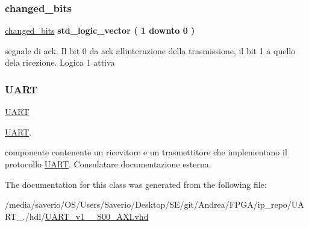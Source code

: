 \subsubsection{\texorpdfstring{changed\+\_\+bits}{changed\_bits}}
{\footnotesize\ttfamily \hyperlink{classUART__v1__0__S00__AXI_1_1arch__imp_a8b1599924c5da95abaa3e673fc0d2cb7}{changed\+\_\+bits} {\bfseries \textcolor{vhdlchar}{std\+\_\+logic\+\_\+vector}\textcolor{vhdlchar}{ }\textcolor{vhdlchar}{(}\textcolor{vhdlchar}{ }\textcolor{vhdlchar}{ } \textcolor{vhdldigit}{1} \textcolor{vhdlchar}{ }\textcolor{vhdlchar}{downto}\textcolor{vhdlchar}{ }\textcolor{vhdlchar}{ } \textcolor{vhdldigit}{0} \textcolor{vhdlchar}{ }\textcolor{vhdlchar}{)}\textcolor{vhdlchar}{ }} \hspace{0.3cm}{\ttfamily [Signal]}}

segnale di ack. Il bit 0 da ack all\textquotesingle{}interuzione della trasmissione, il bit 1 a quello dela ricezione. Logica 1 attiva \mbox{\label{classUART__v1__0__S00__AXI_1_1arch__imp_a6f88b8988ee3bab3eaaa301212c7f804}} 
\subsubsection{\texorpdfstring{U\+A\+RT}{UART}}
{\footnotesize\ttfamily \hyperlink{classUART__v1__0__S00__AXI_1_1arch__imp_a6f88b8988ee3bab3eaaa301212c7f804}{U\+A\+RT} {\bfseries \textcolor{vhdlchar}{ }} \hspace{0.3cm}{\ttfamily [Component]}}



\hyperlink{structUART}{U\+A\+RT}. 

componente contenente un ricevitore e un trasmettitore che implementano il protocollo \hyperlink{structUART}{U\+A\+RT}. Consulatare documentazione esterna. 

The documentation for this class was generated from the following file\+:\begin{DoxyCompactItemize}
\item 
/media/saverio/\+O\+S/\+Users/\+Saverio/\+Desktop/\+S\+E/git/\+Andrea/\+F\+P\+G\+A/ip\+\_\+repo/\+U\+A\+R\+T\+\_./hdl/\hyperlink{UART__v1__0__S00__AXI_8vhd}{U\+A\+R\+T\+\_\+v1\+\_\+\_\+\+S00\+\_\+\+A\+X\+I.\+vhd}\end{DoxyCompactItemize}
